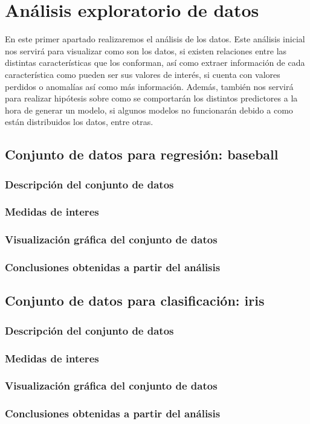 \section{Análisis exploratorio de datos}

En este primer apartado realizaremos el análisis de los datos. Este análisis inicial nos servirá para visualizar como son los datos, si existen relaciones entre las distintas características que los conforman, así como extraer información de cada característica como pueden ser sus valores de interés, si cuenta con valores perdidos o anomalías así como más información. Además, también nos servirá para realizar hipótesis sobre como se comportarán los distintos predictores a la hora de generar un modelo, si algunos modelos no funcionarán debido a como están distribuidos los datos, entre otras.

\subsection{Conjunto de datos para regresión: baseball}

\subsubsection{Descripción del conjunto de datos}

\subsubsection{Medidas de interes}

\subsubsection{Visualización gráfica del conjunto de datos}

\subsubsection{Conclusiones obtenidas a partir del análisis}



\subsection{Conjunto de datos para clasificación: iris}

\subsubsection{Descripción del conjunto de datos}

\subsubsection{Medidas de interes}

\subsubsection{Visualización gráfica del conjunto de datos}

\subsubsection{Conclusiones obtenidas a partir del análisis}
